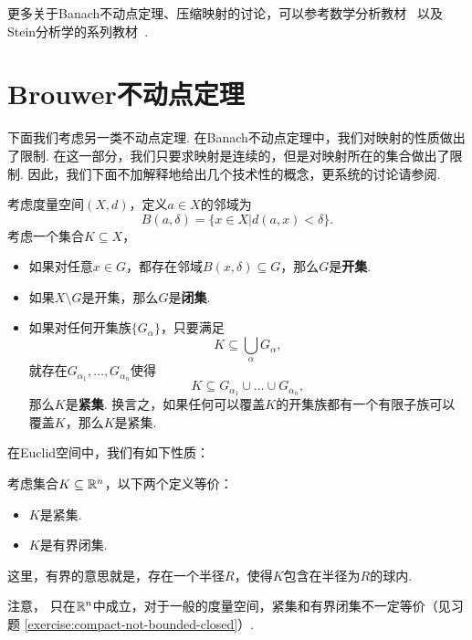 \begin{remark}
    更多关于Banach不动点定理、压缩映射的讨论，可以参考数学分析教材~\cite{zorichMathematicalAnalysisII2016} 以及Stein分析学的系列教材~\cite{steinRealAnalysisMeasure2005,steinFunctionalAnalysisIntroduction2011}.
\end{remark}

\section{Brouwer不动点定理}

下面我们考虑另一类不动点定理. 在Banach不动点定理中，我们对映射的性质做出了限制. 在这一部分，我们只要求映射是连续的，但是对映射所在的集合做出了限制. 因此，我们下面不加解释地给出几个技术性的概念，更系统的讨论请参阅.

\begin{definition}[开集、闭集和紧集]
    考虑度量空间$(X,d)$，定义$a\in X$的邻域为
    \[B(a,\delta)=\{x\in X|d(a,x)<\delta\}.\]
    考虑一个集合$K\subseteq X$，
\begin{itemize}
    \item 如果对任意$x\in G$，都存在邻域$B(x,\delta)\subseteq G$，那么$G$是\textbf{开集}.
    \item 如果$X\setminus G$是开集，那么$G$是\textbf{闭集}.
    \item 如果对任何开集族$\{G_\alpha\}$，只要满足
    \[K\subseteq \bigcup_\alpha G_\alpha,\]
    就存在$G_{\alpha_1},\dots,G_{\alpha_n}$使得
    \[K\subseteq G_{\alpha_1}\cup\dots\cup G_{\alpha_n},\]
    那么$K$是\textbf{紧集}. 换言之，如果任何可以覆盖$K$的开集族都有一个有限子族可以覆盖$K$，那么$K$是紧集.
\end{itemize}
\end{definition}

在Euclid空间中，我们有如下性质：

\begin{theorem}\label{thm:compact-set-iff-bounded-closed}
    考虑集合$K\subseteq\mathbb{R}^n$，以下两个定义等价：
    \begin{itemize}
        \item $K$是紧集.
        \item $K$是有界闭集.
    \end{itemize}
\end{theorem}
这里，有界的意思就是，存在一个半径$R$，使得$K$包含在半径为$R$的球内. 

注意， 只在$\mathbb{R}^n$中成立，对于一般的度量空间，紧集和有界闭集不一定等价（见习题 \ref{exercise:compact-not-bounded-closed}）. 

